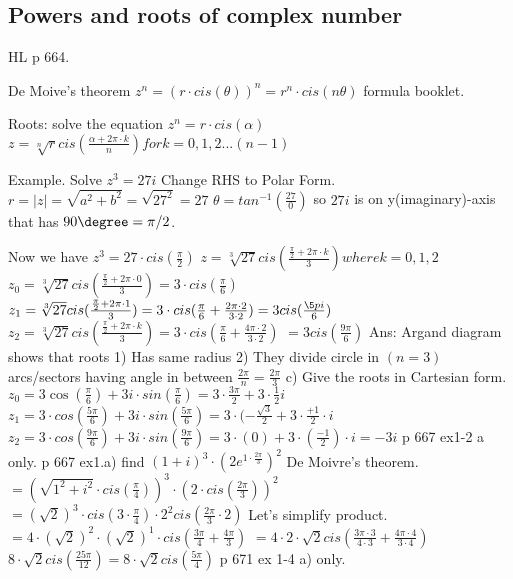 \subsection{Powers and roots of complex number}
HL p 664.

De Moive's theorem $z^n=(r\cdot cis(\theta))^n=r^n\cdot cis(n\theta)$
formula booklet.

Roots: solve the equation
$z^n=r\cdot cis(\alpha)$
$z=\sqrt[n]{r}cis(\frac{\alpha+2\pi\cdot k}{n}) for k=0,1,2...(n-1)$

Example. Solve $z^3=27i$
Change RHS to Polar Form.
$r=|z|=\sqrt{a^2+b^2}=\sqrt{27^2}=27$
$\theta=tan^{-1}(\frac{27}{0})$ so $27i$ is on y(imaginary)-axis that has $90\degree=\pi/2$.

Now we have $z^3=27\cdot cis(\frac{\pi}{2})$
$z=\sqrt[3]{27} cis(\frac{\frac{\pi}{2}+2\pi\cdot k}{3}) where k=0,1,2$
$z_0=\sqrt[3]{27} cis(\frac{\frac{\pi}{2}+2\pi\cdot 0}{3})=3\cdot cis(\frac{\pi}{6})$
$z_1=\sqrt[3]{27} cis(\frac{\frac{\pi}{2}+2\pi\cdot 1}{3})=3\cdot cis(\frac{\pi}{6}+\frac{2\pi\cdot 2}{3\cdot 2})=3cis(\frac{\5pi}{6})$
$z_2=\sqrt[3]{27} cis(\frac{\frac{\pi}{2}+2\pi\cdot k}{3})=3\cdot cis(\frac{\pi}{6}+\frac{4\pi\cdot 2}{3\cdot2})$
$=3cis(\frac{9\pi}{6})$
Ans: Argand diagram shows that roots
1) Has same radius
2) They divide circle in $(n=3)$ arcs/sectors having angle in between $\frac{2\pi}{n}=\frac{2\pi}{3}$
c) Give the roots in Cartesian form.
$z_0=3\cos(\frac{\pi}{6})+3i\cdot sin(\frac{\pi}{6})=3\cdot\frac{3\pi}{2}+3\cdot\frac{1}{2}i$
$z_1=3\cdot cos(\frac{5\pi}{6})+3i\cdot sin(\frac{5\pi}{6})=3\cdot(-\frac{\sqrt{3}}{2}+3\cdot \frac{+1}{2}\cdot i$
$z_2=3\cdot cos(\frac{9\pi}{6})+3i\cdot sin(\frac{9\pi}{6})=3\cdot(0)+3\cdot (\frac{-1}{2})\cdot i=-3i$
p 667 ex1-2 a only.
p 667 ex1.a) find $(1+i)^3\cdot (2e^{1\cdot\frac{2\pi}{3}})^2$
De Moivre's theorem.
$=(\sqrt{1^2+i^2}\cdot cis(\frac{\pi}{4}))^3\cdot(2\cdot cis(\frac{2\pi}{3}))^2$
$=(\sqrt{2})^3\cdot cis(3\cdot\frac{\pi}{4})\cdot 2^2cis(\frac{2\pi}{3}\cdot 2)$
Let's simplify product.
$=4\cdot(\sqrt{2})^2\cdot(\sqrt{2})^1\cdot cis(\frac{3\pi}{4}+\frac{4\pi}{3})$
$=4\cdot2\cdot\sqrt{2}cis(\frac{3\pi\cdot 3}{4\cdot 3}+\frac{4\pi\cdot 4}{3\cdot 4})$
$8\cdot\sqrt{2}cis(\frac{25\pi}{12})=8\cdot\sqrt{2}cis(\frac{5\pi}{4})$
p 671 ex 1-4 a) only.
